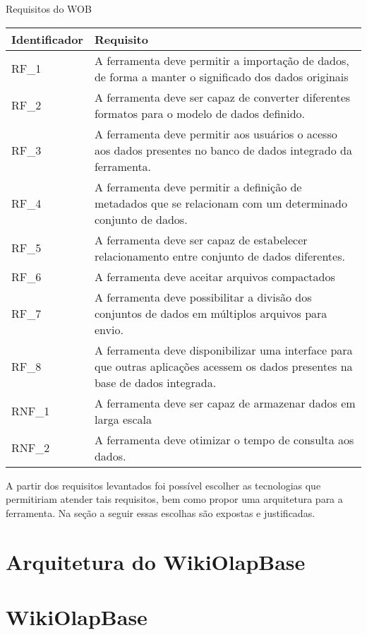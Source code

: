 \begin{quadro}[!htb]
    \centering
    \caption{Requisitos do WOB}
    \label{quadro:requisitos}
    \begin{tabular}{|p{2cm}|p{13cm}|}
        \hline
        Identificador   &   Requisito \\
        \hline
        RF\_1    &  A ferramenta deve permitir a importação de dados, de forma a manter o significado dos dados originais \\   
        \hline
        RF\_2    &  A ferramenta deve ser capaz de converter diferentes formatos para o modelo de dados definido. \\        
        \hline
        RF\_3    &  A ferramenta deve permitir aos usuários o acesso aos dados presentes no banco de dados integrado da ferramenta. \\
        \hline
        RF\_4    &  A ferramenta deve permitir a definição de metadados que se relacionam com um determinado conjunto de dados. \\
        \hline
        RF\_5    &  A ferramenta deve ser capaz de estabelecer relacionamento entre conjunto de dados diferentes. \\
        \hline
        RF\_6    &  A ferramenta deve aceitar arquivos compactados \\
        \hline
        RF\_7    &  A ferramenta deve possibilitar a divisão dos conjuntos de dados em múltiplos arquivos para envio. \\        
        \hline
        RF\_8    &  A ferramenta deve disponibilizar uma interface para que outras aplicações acessem os dados presentes na base de dados integrada. \\
        \hline
        RNF\_1    &  A ferramenta deve ser capaz de armazenar dados em larga escala \\
        \hline
        RNF\_2    &  A ferramenta deve otimizar o tempo de consulta aos dados. \\ 
        \hline   
    \end{tabular}
\end{quadro}

A partir dos requisitos levantados foi possível escolher as tecnologias que permitiriam atender
tais requisitos, bem como propor uma arquitetura para a ferramenta. Na seção a seguir essas 
escolhas são expostas e justificadas.

\section{Arquitetura do WikiOlapBase}
\label{sec:arquitetura}

\section{WikiOlapBase}
\label{sec:wob}